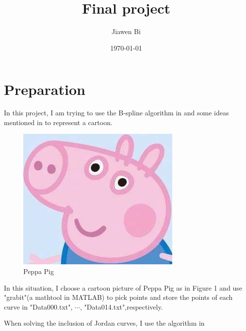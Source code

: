 \documentclass[]{article}
\title{Final project}
\author{Jiawen Bi}
\date{\today}
\begin{document}
\maketitle


\section{Preparation}
In this project, I am trying to use the B-spline algorithm in \cite{numana} and some ideas mentioned in \cite{zhang2019fluid} to represent a cartoon.
\par
\begin{figure}[ht]
	\centering
	\includegraphics[scale = 0.8]{fig.jpg}
	\caption{Peppa Pig}
	\label{fig:fig}
\end{figure}
In this situation, I choose a cartoon picture of Peppa Pig as in Figure 1
and use "grabit"(a mathtool in MATLAB) to pick points and store the points of each curve in "Data000.txt", $\cdots$, "Data014.txt",respectively.\par
When solving the inclusion of Jordan curves, I use the algorithm in \cite{suanfa}


\end{document}

